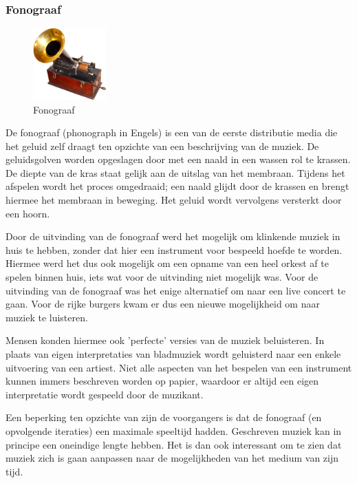 \subsubsection*{Fonograaf}
\begin{figure}
    \centering
    \includegraphics[width=0.25\textwidth]{assets/critical-review/EdisonPhonograph.jpg}
    \caption{Fonograaf}
    \label{fig:critical-review:phonograph}
\end{figure}

De fonograaf (phonograph in Engels) is een van de eerste distributie media die het geluid zelf draagt ten opzichte van een beschrijving van de muziek. De geluidsgolven worden opgeslagen door met een naald in een wassen rol te krassen. De diepte van de kras staat gelijk aan de uitslag van het membraan. Tijdens het afspelen wordt het proces omgedraaid; een naald glijdt door de krassen en brengt hiermee het membraan in beweging. Het geluid wordt vervolgens versterkt door een hoorn.

Door de uitvinding van de fonograaf werd het mogelijk om klinkende muziek in huis te hebben, zonder dat hier een instrument voor bespeeld hoefde te worden. Hiermee werd het dus ook mogelijk om een opname van een heel orkest af te spelen binnen huis, iets wat voor de uitvinding niet mogelijk was. Voor de uitvinding van de fonograaf was het enige alternatief om naar een live concert te gaan. Voor de rijke burgers kwam er dus een nieuwe mogelijkheid om naar muziek te luisteren.

Mensen konden hiermee ook 'perfecte' versies van de muziek beluisteren. In plaats van eigen interpretaties van bladmuziek wordt geluisterd naar een enkele uitvoering van een artiest. Niet alle aspecten van het bespelen van een instrument kunnen immers beschreven worden op papier, waardoor er altijd een eigen interpretatie wordt gespeeld door de muzikant.

Een beperking ten opzichte van zijn de voorgangers is dat de fonograaf (en opvolgende iteraties) een maximale speeltijd hadden. Geschreven muziek kan in principe een oneindige lengte hebben. Het is dan ook interessant om te zien dat muziek zich is gaan aanpassen naar de mogelijkheden van het medium van zijn tijd.

